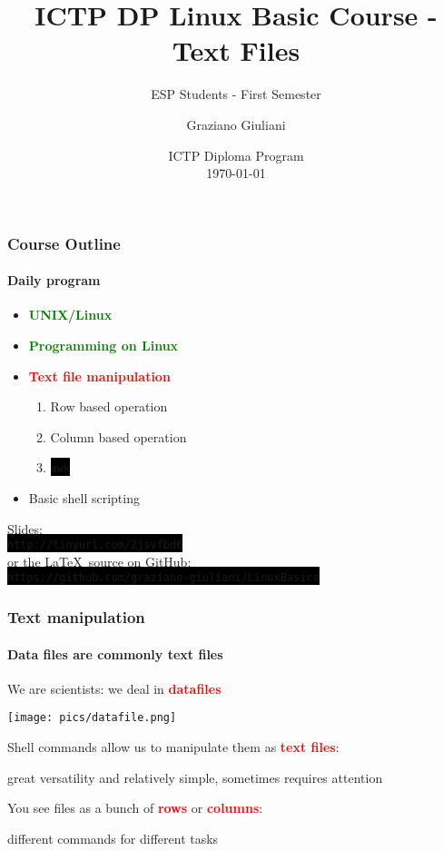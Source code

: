 \documentclass[unknownkeysallowed, 10pt, a4 paper, handout]{beamer}
\title[Linux Programming]{ICTP DP Linux Basic Course - Text Files}
\subtitle{ESP Students - First Semester}
\author[Graziano Giuliani]{Graziano Giuliani \\ \focus{ggiulian@ictp.it}}
\institute[ICTP]{The Abdus Salam International Centre for Theoretical Physics}
\date[\today]{ICTP Diploma Program \\ \today}
\newcommand{\focus}[1]{\textbf{\textcolor{red}{#1}}}
\newcommand{\expire}[1]{\textbf{\textcolor{green}{#1}}}
\newcommand{\code}[1]{\colorbox{black}{\color{green}\texttt{#1}}}
\begin{document}
\begin{frame}
  \titlepage
\end{frame}


\begin{frame}[label=outline]
  \frametitle{Course Outline \footnotemark}
  \framesubtitle{Daily program}
  \begin{itemize}
    \item \expire{UNIX/Linux}
    \item \expire{Programming on Linux}
    \item \focus{Text file manipulation}
      \begin{enumerate}
        \item Row based operation
        \item Column based operation
        \item \code{awk}
      \end{enumerate}
    \item Basic shell scripting
  \end{itemize}

  \vspace{6mm}

  Slides: \\ \code{http://tinyurl.com/2jsvfbd6}
  \vspace{4mm} \\
  or the \LaTeX \ source on GitHub: \\
  \code{https://github.com/graziano-giuliani/LinuxBasics}


\end{frame}


\begin{frame}
  \frametitle{Text manipulation}
  \framesubtitle{Data files are commonly text files}
  We are scientists: we deal in \focus{datafiles}

  \begin{center}
    \texttt{[image: pics/datafile.png]}
  \end{center}

  \begin{block}{}
    Shell commands allow us to manipulate them as \focus{text files}:\\
    \begin{center}
    great versatility and relatively simple, sometimes requires attention
    \end{center}
    You see files as a bunch of \focus{rows} or \focus{columns}:\\
    \begin{center}
    different commands for different tasks
    \end{center}
  \end{block}
\end{frame}
\end{document}
